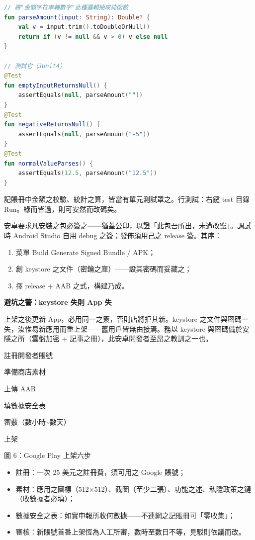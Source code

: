 \begin{lstlisting}[language=Kotlin]
// 將"金額字符串轉數字"此種邏輯抽成純函數
fun parseAmount(input: String): Double? {
    val v = input.trim().toDoubleOrNull()
    return if (v != null && v > 0) v else null
}

// 測試它（JUnit4）
@Test
fun emptyInputReturnsNull() {
    assertEquals(null, parseAmount(""))
}
@Test
fun negativeReturnsNull() {
    assertEquals(null, parseAmount("-5"))
}
@Test
fun normalValueParses() {
    assertEquals(12.5, parseAmount("12.5"))
}
\end{lstlisting}

記賬冊中金額之校驗、統計之算，皆當有單元測試罩之。行測試：右鍵 test 目錄 Run。綠而皆過，則可安然而改碼矣。


安卓要求凡安裝之包必簽之——猶蓋公印，以證「此包吾所出，未遭改竄」。調試時 Android Studio 自用 debug 之簽；發佈須用己之 release 簽。其序：

\begin{enumerate}
  \item 菜單 Build Generate Signed Bundle / APK；
  \item 創 keystore 之文件（密鑰之庫）——設其密碼而妥藏之；
  \item 擇 release + AAB 之式，構建乃成。
\end{enumerate}

\textbf{避坑之警：keystore 失則 App 失}\par

上架之後更新 App，必用同一之簽，否則店將拒其新。keystore 之文件與密碼一失，汝惟易新應用而重上架——舊用戶皆無由接焉。務以 keystore 與密碼備於安隱之所（雲盤加密 + 記事之冊），此安卓開發者至昂之教訓之一也。


註冊開發者賬號

準備商店素材

上傳 AAB

填數據安全表

審覈（數小時\textasciitilde{}數天）

上架

\begin{center}\small\color{gray}圖 6：Google Play 上架六步\end{center}

\begin{itemize}
  \item 註冊：一次 25 美元之註冊費，須可用之 Google 賬號；
  \item 素材：應用之圖標（512×512）、截圖（至少二張）、功能之述、私隱政策之鏈（收數據者必填）；
  \item 數據安全之表：如實申報所收何數據——不連網之記賬冊可「零收集」；
  \item 審核：新賬號首番上架恆為人工所審，數時至數日不等，見駁則依議而改。
\end{itemize}

